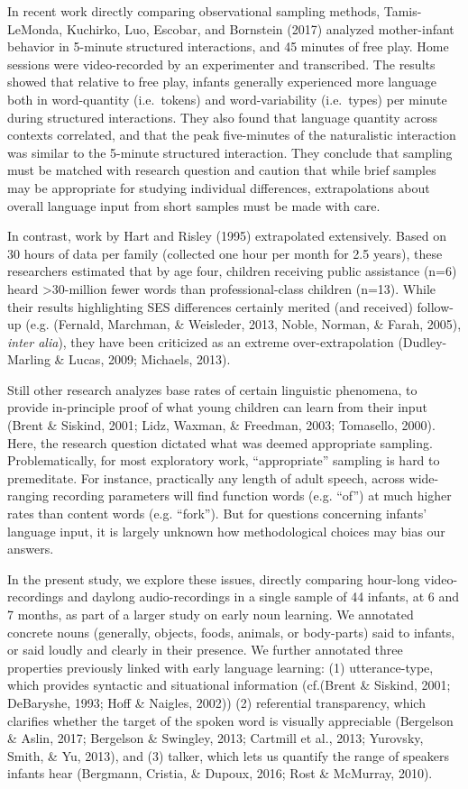 \documentclass[floatsintext,man]{apa6}
\theoremstyle{definition}
\theoremstyle{definition}
\theoremstyle{definition}
\theoremstyle{remark}
\begin{document}
In recent work directly comparing observational sampling methods,
Tamis-LeMonda, Kuchirko, Luo, Escobar, and Bornstein (2017) analyzed
mother-infant behavior in 5-minute structured interactions, and 45
minutes of free play. Home sessions were video-recorded by an
experimenter and transcribed. The results showed that relative to free
play, infants generally experienced more language both in word-quantity
(i.e.~tokens) and word-variability (i.e.~types) per minute during
structured interactions. They also found that language quantity across
contexts correlated, and that the peak five-minutes of the naturalistic
interaction was similar to the 5-minute structured interaction. They
conclude that sampling must be matched with research question and
caution that while brief samples may be appropriate for studying
individual differences, extrapolations about overall language input from
short samples must be made with care.

In contrast, work by Hart and Risley (1995) extrapolated extensively.
Based on 30 hours of data per family (collected one hour per month for
2.5 years), these researchers estimated that by age four, children
receiving public assistance (n=6) heard \textgreater{}30-million fewer
words than professional-class children (n=13). While their results
highlighting SES differences certainly merited (and received) follow-up
(e.g. (Fernald, Marchman, \& Weisleder, 2013, Noble, Norman, \& Farah,
2005), \emph{inter alia}), they have been criticized as an extreme
over-extrapolation (Dudley-Marling \& Lucas, 2009; Michaels, 2013).

Still other research analyzes base rates of certain linguistic
phenomena, to provide in-principle proof of what young children can
learn from their input (Brent \& Siskind, 2001; Lidz, Waxman, \&
Freedman, 2003; Tomasello, 2000). Here, the research question dictated
what was deemed appropriate sampling. Problematically, for most
exploratory work, \enquote{appropriate} sampling is hard to premeditate.
For instance, practically any length of adult speech, across
wide-ranging recording parameters will find function words (e.g.
\enquote{of}) at much higher rates than content words (e.g.
\enquote{fork}). But for questions concerning infants' language input,
it is largely unknown how methodological choices may bias our answers.

In the present study, we explore these issues, directly comparing
hour-long video-recordings and daylong audio-recordings in a single
sample of 44 infants, at 6 and 7 months, as part of a larger study on
early noun learning. We annotated concrete nouns (generally, objects,
foods, animals, or body-parts) said to infants, or said loudly and
clearly in their presence. We further annotated three properties
previously linked with early language learning: (1) utterance-type,
which provides syntactic and situational information (cf.(Brent \&
Siskind, 2001; DeBaryshe, 1993; Hoff \& Naigles, 2002)) (2) referential
transparency, which clarifies whether the target of the spoken word is
visually appreciable (Bergelson \& Aslin, 2017; Bergelson \& Swingley,
2013; Cartmill et al., 2013; Yurovsky, Smith, \& Yu, 2013), and (3)
talker, which lets us quantify the range of speakers infants hear
(Bergmann, Cristia, \& Dupoux, 2016; Rost \& McMurray, 2010).
\end{document}
